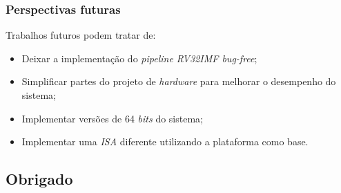 \documentclass[aspectratio=169]{beamer}
\begin{document}
    \begin{frame}
        \vfill
        \frametitle{Perspectivas futuras}
        {Trabalhos futuros podem tratar de:}
        \begin{itemize}
            \item Deixar a implementação do \textit{pipeline RV32IMF bug-free};
            \item Simplificar partes do projeto de \textit{hardware} para melhorar o desempenho do sistema;
            \item Implementar versões de 64 \textit{bits} do sistema;
            \item Implementar uma \textit{ISA} diferente utilizando a plataforma como base.
        \end{itemize}
        \vfill
    \end{frame}

    \subsection{Obrigado}
\end{document}
